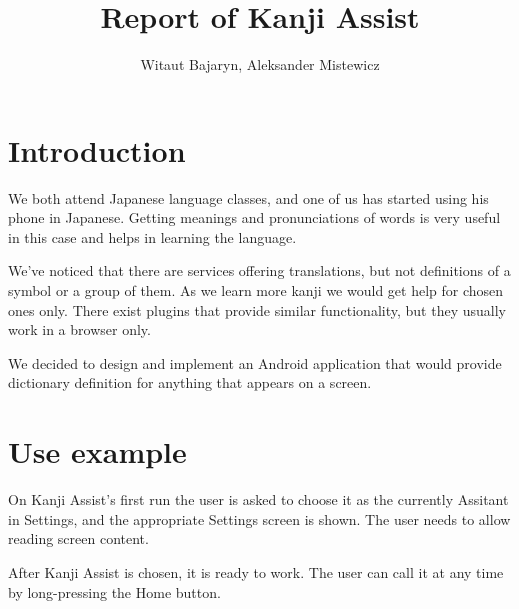 \documentclass[11pt,a4paper]{article}
\title{Report of Kanji Assist}
\author{Witaut Bajaryn, Aleksander Mistewicz}
\begin{document}
\maketitle
\newpage

\section{Introduction}

We both attend Japanese language classes,
and one of us has started using his phone in Japanese.
Getting meanings and pronunciations of words
is very useful in this case and helps in learning the language.

We've noticed that there are services offering translations,
but not definitions of a symbol or a group of them.
As we learn more kanji we would get help for chosen ones only.
There exist plugins that provide similar functionality, but they usually
work in a browser only.

We decided to design and implement an Android application that would
provide dictionary definition for anything that appears on a screen.

\section{Use example}

On Kanji Assist's first run the user is asked
to choose it as the currently Assitant in Settings, and the appropriate
Settings screen is shown. The user needs to allow reading screen content.

After Kanji Assist is chosen, it is ready to work.
The user can call it at any time by long-pressing the Home button.
\end{document}
